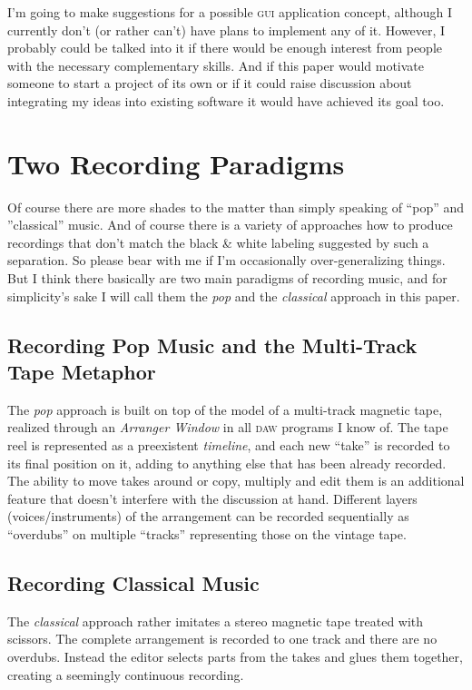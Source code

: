 \documentclass[11pt,a4paper]{article}
\begin{document}
I'm going to make suggestions for a possible \textsc{gui} application concept, although I currently don't (or rather can't) have plans to implement any of it.
However, I probably could be talked into it if there would be enough interest from people with the necessary complementary skills.
And if this paper would motivate someone to start a project of its own or if it could raise discussion about integrating my ideas into existing software it would have achieved its goal too.

\section{Two Recording Paradigms}

Of course there are more shades to the matter  than simply speaking of “pop” and ”classical” music.
And of course there is a variety of approaches how to produce recordings that don't match the black \& white labeling suggested by such a separation.
So please bear with me if I'm occasionally over-generalizing things.
But I think there basically are two main paradigms of recording music, and for simplicity's sake I will call them the \emph{pop} and the \emph{classical} approach in this paper.

\subsection{Recording Pop Music and the Multi-Track Tape Metaphor}

The \emph{pop} approach is built on top of the model of a multi-track magnetic tape, realized through an \emph{Arranger Window} in all \textsc{daw} programs I know of.
The tape reel is represented as a preexistent \emph{timeline}, and each new “take” is recorded to its final position on it, adding to anything else that has been already recorded.
The ability to move takes around or copy, multiply and edit them is an additional feature that doesn't interfere with the discussion at hand.
Different layers (voices/instruments) of the arrangement can be recorded sequentially as “overdubs” on multiple “tracks” representing those on the vintage tape.

\subsection{Recording Classical Music}
 
The \emph{classical} approach rather imitates a stereo magnetic tape treated with scissors.
The complete arrangement is recorded to one track and there are no overdubs.
Instead the editor selects parts from the takes and glues them together, creating a seemingly continuous recording.
\end{document}
